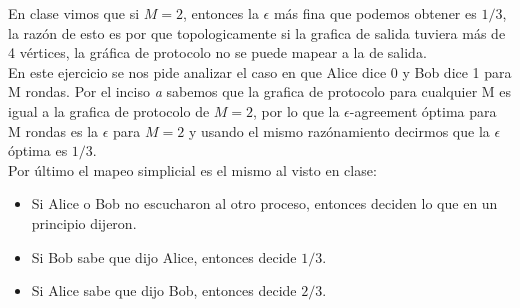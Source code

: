 \documentclass{article}
\begin{document}
\begin{enumerate}
{\begin{enumerate}
{          En clase vimos que si $M = 2$, entonces la $\epsilon$ más fina que podemos obtener es
          $1/3$, la razón de esto es por que topologicamente si la grafica de salida tuviera 
          más de 4 vértices, la gráfica de protocolo no se puede mapear a la de salida.\\
          En este ejercicio se nos pide analizar el caso en que Alice dice 0 y Bob dice 1 para M
          rondas. Por el inciso \textit{a} sabemos que la grafica de protocolo para cualquier
          M es igual a la grafica de protocolo de $M = 2$, por lo que la $\epsilon$-agreement 
          óptima para M rondas es la $\epsilon$ para $M = 2$ y usando el mismo razónamiento
          decirmos que la $\epsilon$ óptima es $1/3$.\\
          Por último el mapeo simplicial es el mismo al visto en clase: 
          
          \begin{itemize}
            \item{Si Alice o Bob no escucharon al otro proceso, entonces deciden lo que en un principio
              dijeron.}
            \item{Si Bob sabe que dijo Alice, entonces decide $1/3$.}
            \item{Si Alice sabe que dijo Bob, entonces decide $2/3$.}
          \end{itemize}

          
          
        }
        
      \end{enumerate}
    }
    
  \end{enumerate}
\end{document}
